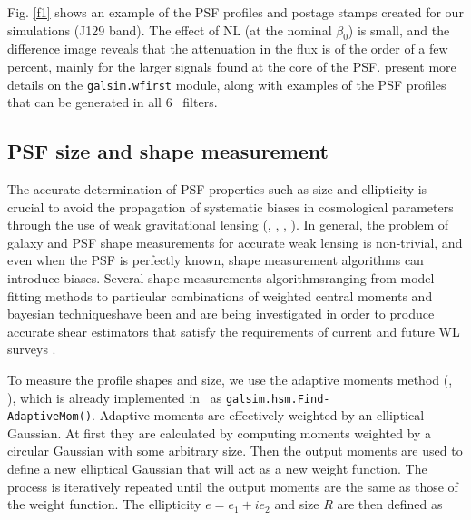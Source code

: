 \documentclass[11pt,preprint,flushrt]{aastex}
\begin{document}
Fig. \ref{f1} shows an example of the PSF profiles and postage stamps created for our simulations (J129 band). The effect of NL (at the nominal $\beta_0$) is small, and the difference image reveals that the attenuation in the flux is of the order of a few percent, mainly for the larger signals found at the core of the PSF.  \citealt{kannawadi15} present more details on the {\tt{galsim.wfirst}} module, along with examples of the PSF profiles that can be generated in all 6 \wfa\ filters. 
\subsection {PSF size and shape measurement}
The accurate determination of PSF properties such as size and ellipticity is crucial to avoid the propagation of systematic biases in cosmological parameters through the use of weak gravitational lensing (\citealt{paulin08}, \citealt{paulin09}, \citealt{massey13}, \citealt{cropper13}). In general, the problem of galaxy and PSF shape measurements for accurate weak lensing is non-trivial, and even when the PSF is perfectly known, shape measurement algorithms can introduce biases. Several shape measurements algorithms\textemdash ranging from model-fitting methods to particular combinations of weighted central moments and bayesian techniques\textemdash have been and are being investigated in order to produce accurate shear estimators that satisfy the requirements of current and future WL surveys \citep{mandelbaum15}.

To measure the profile shapes and size, we use the adaptive moments method (\citealt{bernstein02}, \citealt{hirata03}), which is already implemented in \gs\ as {\tt{galsim.hsm.Find-\\AdaptiveMom()}}. Adaptive moments are effectively weighted by an elliptical Gaussian. At first they are calculated by computing moments weighted by a circular Gaussian with some arbitrary size. Then the output moments are used to define a new elliptical Gaussian that will act as a new weight function. The process is iteratively repeated until the output moments are the same as those of the weight function. The ellipticity $e=e_1 + ie_2$ and size $R$ are then defined as
\end{document}
